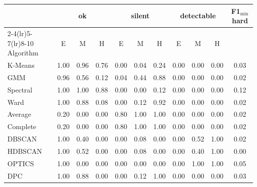 \begin{tabular}{@{}l ccc ccc ccc c@{}}
\toprule
 & \multicolumn{3}{c}{ok} & \multicolumn{3}{c}{silent} & \multicolumn{3}{c}{detectable} & F1$_{\min}$ hard \\
\cmidrule(lr){2-4}\cmidrule(lr){5-7}\cmidrule(lr){8-10}
Algorithm & E & M & H & E & M & H & E & M & H & \\
\midrule
K-Means & 1.00 & 0.96 & 0.76 & 0.00 & 0.04 & 0.24 & 0.00 & 0.00 & 0.00 & 0.03 \\
GMM & 0.96 & 0.56 & 0.12 & 0.04 & 0.44 & 0.88 & 0.00 & 0.00 & 0.00 & 0.02 \\
Spectral & 1.00 & 1.00 & 0.88 & 0.00 & 0.00 & 0.12 & 0.00 & 0.00 & 0.00 & 0.12 \\
Ward & 1.00 & 0.88 & 0.08 & 0.00 & 0.12 & 0.92 & 0.00 & 0.00 & 0.00 & 0.02 \\
Average & 0.20 & 0.00 & 0.00 & 0.80 & 1.00 & 1.00 & 0.00 & 0.00 & 0.00 & 0.02 \\
Complete & 0.20 & 0.00 & 0.00 & 0.80 & 1.00 & 1.00 & 0.00 & 0.00 & 0.00 & 0.02 \\
DBSCAN & 1.00 & 0.40 & 0.00 & 0.00 & 0.08 & 0.00 & 0.00 & 0.52 & 1.00 & 0.02 \\
HDBSCAN & 1.00 & 0.52 & 0.00 & 0.00 & 0.08 & 0.00 & 0.00 & 0.40 & 1.00 & 0.00 \\
OPTICS & 1.00 & 0.00 & 0.00 & 0.00 & 0.00 & 0.00 & 0.00 & 1.00 & 1.00 & 0.05 \\
DPC & 1.00 & 0.88 & 0.00 & 0.00 & 0.12 & 1.00 & 0.00 & 0.00 & 0.00 & 0.03 \\
\bottomrule
\end{tabular}
